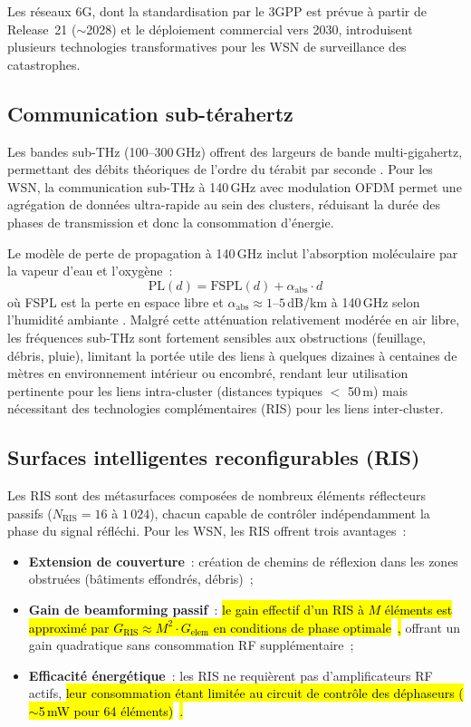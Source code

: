 Les réseaux 6G, dont la standardisation par le 3GPP est prévue à partir de Release~21 ($\sim$2028) et le déploiement commercial vers 2030, introduisent plusieurs technologies transformatives pour les WSN de surveillance des catastrophes.

\subsection{Communication sub-térahertz}

Les bandes sub-THz (100--300\,GHz) offrent des largeurs de bande multi-gigahertz, permettant des débits théoriques de l'ordre du térabit par seconde \cite{saad2020vision6g,etri_6g_disaster2024}. Pour les WSN, la communication sub-THz à 140\,GHz avec modulation OFDM permet une agrégation de données ultra-rapide au sein des clusters, réduisant la durée des phases de transmission et donc la consommation d'énergie.

Le modèle de perte de propagation à 140\,GHz inclut l'absorption moléculaire par la vapeur d'eau et l'oxygène~:
\begin{equation}
    \text{PL}(d) = \text{FSPL}(d) + \alpha_{\text{abs}} \cdot d
\end{equation}
où FSPL est la perte en espace libre et $\alpha_{\text{abs}} \approx 1$--$5$\,dB/km à 140\,GHz selon l'humidité ambiante \cite{saad2020vision6g}. Malgré cette atténuation relativement modérée en air libre, les fréquences sub-THz sont fortement sensibles aux obstructions (feuillage, débris, pluie), limitant la portée utile des liens à quelques dizaines à centaines de mètres en environnement intérieur ou encombré, rendant leur utilisation pertinente pour les liens intra-cluster (distances typiques $<$ 50\,m) mais nécessitant des technologies complémentaires (RIS) pour les liens inter-cluster.

\subsection{Surfaces intelligentes reconfigurables (RIS)}

Les RIS sont des métasurfaces composées de nombreux éléments réflecteurs passifs ($N_{\text{RIS}} = 16$ à $1\,024$), chacun capable de contrôler indépendamment la phase du signal réfléchi. Pour les WSN, les RIS offrent trois avantages~:
\begin{itemize}
    \item \textbf{Extension de couverture}~: création de chemins de réflexion dans les zones obstruées (bâtiments effondrés, débris)~;
    \item \textbf{Gain de beamforming passif}~: \hl{le gain effectif d'un RIS à $M$ éléments est approximé par $G_{\text{RIS}} \approx M^2 \cdot G_{\text{elem}}$ en conditions de phase optimale}~\cite{huang2021ris}\hl{,} offrant un gain quadratique sans consommation RF supplémentaire~;
    \item \textbf{Efficacité énergétique}~: les RIS ne requièrent pas d'amplificateurs RF actifs, \hl{leur consommation étant limitée au circuit de contrôle des déphaseurs ($\sim$5\,mW pour 64 éléments)}~\cite{huang2021ris}\hl{.}
\end{itemize}

